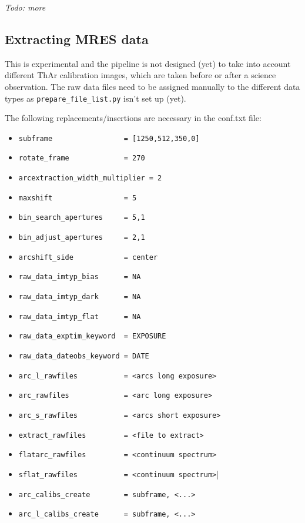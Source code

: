 \documentclass[10pt,a4paper]{article}
\begin{document}
\textit{Todo: more}

\subsection{Extracting MRES data}

This is experimental and the pipeline is not designed (yet) to take into account different ThAr calibration images, which are taken before or after a science observation. The raw data files need to be assigned manually to the different data types as \verb|prepare_file_list.py| isn't set up (yet).

\noindent The following replacements/insertions are necessary in the conf.txt file:
\begin{itemize}\setlength\itemsep{0em}
\small
  \item \verb|subframe                 = [1250,512,350,0]|
  \item \verb|rotate_frame             = 270|
  \item \verb|arcextraction_width_multiplier = 2|
  \item \verb|maxshift                 = 5|
  \item \verb|bin_search_apertures     = 5,1|
  \item \verb|bin_adjust_apertures     = 2,1|
  \item \verb|arcshift_side            = center|
  \item \verb|raw_data_imtyp_bias      = NA|
  \item \verb|raw_data_imtyp_dark      = NA|
  \item \verb|raw_data_imtyp_flat      = NA|
  \item \verb|raw_data_exptim_keyword  = EXPOSURE|
  \item \verb|raw_data_dateobs_keyword = DATE|
  \item \verb|arc_l_rawfiles           = <arcs long exposure>|
  \item \verb|arc_rawfiles             = <arc long exposure>|
  \item \verb|arc_s_rawfiles           = <arcs short exposure>|
  \item \verb|extract_rawfiles         = <file to extract>|
  \item \verb|flatarc_rawfiles         = <continuum spectrum>|
  \item \verb|sflat_rawfiles           = <continuum spectrum>||
  \item \verb|arc_calibs_create        = subframe, <...>|
  \item \verb|arc_l_calibs_create      = subframe, <...>|

\end{itemize}
\end{document}
